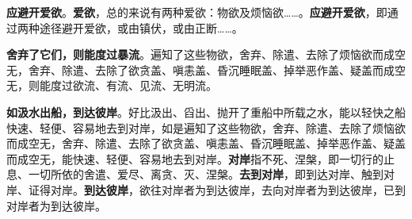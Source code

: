 \textbf{应避开爱欲}。\textbf{爱欲}，总的来说有两种爱欲：物欲及烦恼欲……。\textbf{应避开爱欲}，即通过两种途径避开爱欲，或由镇伏，或由正断……。


\textbf{舍弃了它们，则能度过暴流}。遍知了这些物欲，舍弃、除遣、去除了烦恼欲而成空无，舍弃、除遣、去除了欲贪盖、嗔恚盖、昏沉睡眠盖、掉举恶作盖、疑盖而成空无，则能度过欲流、有流、见流、无明流。


\textbf{如汲水出船，到达彼岸}。好比汲出、舀出、抛开了重船中所载之水，能以轻快之船快速、轻便、容易地去到对岸，如是遍知了这些物欲，舍弃、除遣、去除了烦恼欲而成空无，舍弃、除遣、去除了欲贪盖、嗔恚盖、昏沉睡眠盖、掉举恶作盖、疑盖而成空无，能快速、轻便、容易地去到对岸。\textbf{对岸}指不死、涅槃，即一切行的止息、一切所依的舍遣、爱尽、离贪、灭、涅槃。\textbf{去到对岸}，即到达对岸、触到对岸、证得对岸。\textbf{到达彼岸}，欲往对岸者为到达彼岸，去向对岸者为到达彼岸，已到对岸者为到达彼岸。


